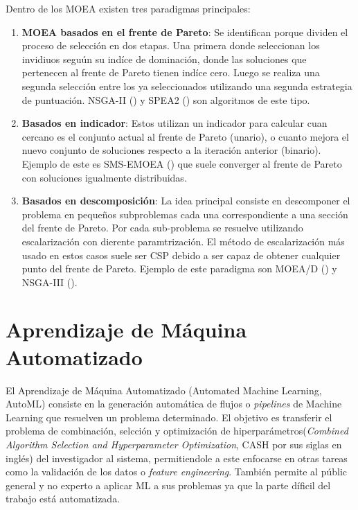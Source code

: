 Dentro de los MOEA existen tres paradigmas principales:
\begin{enumerate}
    \item \textbf{MOEA basados en el frente de Pareto}: Se identifican porque dividen el proceso de selecci\'on en dos etapas. Una primera donde seleccionan los invidiuos segu\'un su ind\'ice de dominaci\'on, donde las soluciones que pertenecen al frente de Pareto tienen ind\'ice cero. Luego se realiza una segunda selecci\'on entre los ya seleccionados utilizando una segunda estrategia de puntuaci\'on. NSGA-II (\cite{deb2002fast}) y SPEA2 (\cite{zitzler1999multiobjective}) son algoritmos de este tipo.

    \item \textbf{Basados en indicador}: Estos utilizan un indicador para calcular cuan cercano es el conjunto actual al frente de Pareto (unario), o cuanto mejora el nuevo conjunto de soluciones respecto a la iteraci\'on anterior (binario). Ejemplo de este es SMS-EMOEA (\cite{emmerich2005emo}) que suele converger al frente de Pareto con soluciones igualmente distribuidas.

    \item \textbf{Basados en descomposici\'on}: La idea principal consiste en descomponer el problema en pequeños subproblemas cada una correspondiente a una secci\'on del frente de Pareto. Por cada sub-problema se resuelve utilizando escalarizaci\'on con dierente paramtrizaci\'on. El m\'etodo de escalarizaci\'on m\'as usado en estos casos suele ser CSP debido a ser capaz de obtener cualquier punto del frente de Pareto. Ejemplo de este paradigma son MOEA/D (\cite{zhang2007moea}) y NSGA-III (\cite{deb2013evolutionary}).
\end{enumerate}


\section{Aprendizaje de M\'aquina Automatizado}
El Aprendizaje de M\'aquina Automatizado (Automated Machine Learning, AutoML) consiste en la generaci\'on autom\'atica de flujos o \textit{pipelines} de Machine Learning que resuelven un problema determinado. El objetivo es transferir el problema de combinaci\'on, selcci\'on y optimizaci\'on de hiperpar\'ametros(\textit{Combined Algorithm Selection and Hyperparameter Optimization}, CASH por sus siglas en ingl\'es) del investigador al sistema, permitiendole a este enfocarse en otras tareas como la validaci\'on de los datos o \textit{feature engineering}. Tambi\'en permite al p\'ublic general y no experto a aplicar ML a sus problemas ya que la parte d\'ificil del trabajo est\'a automatizada. 

